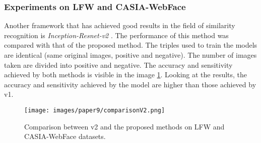 \subsubsection{Experiments on LFW and CASIA-WebFace}
Another framework that has achieved good results in the field of similarity 
recognition is \emph{Inception-Resnet-v2} \cite{0902694022}. The performance of this method was 
compared with that of the proposed method. The triples used to train the 
models are identical (same original images, positive and negative). The number 
of images taken are divided into positive and negative. The accuracy and 
sensitivity achieved by both methods is visible in the image \ref{fig:compareV2}. Looking at 
the results, the accuracy and sensitivity achieved by the model are higher 
than those achieved by v1.
\begin{figure}[h!]
    \centering
    \texttt{[image: images/paper9/comparisonV2.png]}
    \centering
    \caption{Comparison between v2 and the proposed methods on LFW and CASIA-WebFace datasets.}
    \label{fig:compareV2}
\end{figure}

